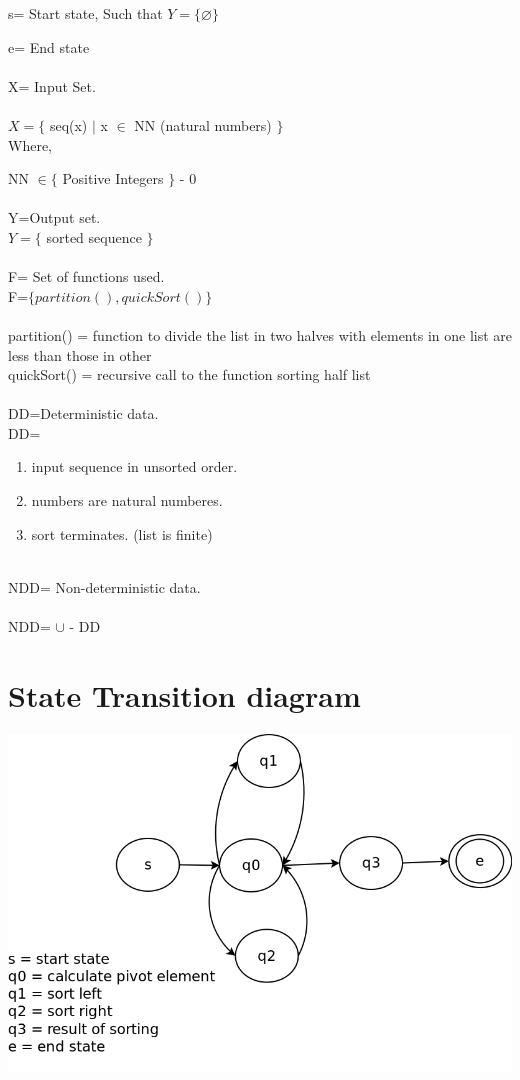 \documentclass[10pt,a4paper]{article}
\begin{document}
s= Start state,  Such that $Y=\lbrace \varnothing \rbrace$ 

e= End state  \\\\
X= Input Set. \\\\
$X=\lbrace$ seq(x) $\mid$ x $\in$ NN (natural numbers) $\rbrace$ \\
Where,

NN $\in \lbrace$ Positive Integers $\rbrace$ - 0\\\\ 
Y=Output set.\\
$Y=\lbrace$ sorted sequence $\rbrace $ \\\\
F= Set of functions used.\\
F=$\lbrace partition(), quickSort() \rbrace$ \\\\
partition() = function to divide the list in two halves with elements in one list are less than those in other\\
quickSort() = recursive call to the function sorting half list\\\\
DD=Deterministic data. \\
DD=
\begin{enumerate}
\item input sequence in unsorted order.
\item numbers are natural numberes.
\item sort terminates. (list is finite)\\\\
\end{enumerate}
NDD= Non-deterministic data. \\
\\NDD= $\cup$ - DD\\


\section{State Transition diagram}
\includegraphics[scale=0.3]{stdg.png}
\end{document}
